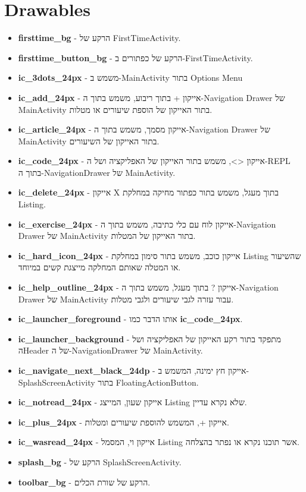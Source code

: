 \section{Drawables}

\begin{itemize}
  \item \textbf{firsttime\_bg} - הרקע של FirstTimeActivity.
  \item \textbf{firsttime\_button\_bg} - הרקע של כפתורים ב-FirstTimeActivity.
  \item \textbf{ic\_3dots\_24px} - משמש ב-MainActivity בתור Options Menu
  \item \textbf{ic\_add\_24px} - אייקון + בתוך ריבוע, משמש בתוך ה-Navigation Drawer של MainActivity בתור האייקון של הוספת שיעורים או מטלות.
  \item \textbf{ic\_article\_24px} - אייקון מסמך, משמש בתוך ה-Navigation Drawer של MainActivity בתור האייקון של השיעורים.
  \item \textbf{ic\_code\_24px} - אייקון <>, משמש בתור האייקון של האפליקציה ושל ה-REPL בתוך ה-NavigationDrawer של MainActivity.
  \item \textbf{ic\_delete\_24px} - אייקון X בתוך מעגל, משמש בתור כפתור מחיקה במחלקת Listing.
  \item \textbf{ic\_exercise\_24px}  - אייקון לוח עם כלי כתיבה, משמש בתוך ה-Navigation Drawer של MainActivity בתור האייקון של המטלות.
  \item \textbf{ic\_hard\_icon\_24px} - אייקון כוכב, משמש בתור סימון במחלקת Listing שהשיעור או המטלה שאותם המחלקה מייצגת קשים במיוחד.
  \item \textbf{ic\_help\_outline\_24px} - אייקון ? בתוך מעגל, משמש בתוך ה-Navigation Drawer של MainActivity עבור עזרה לגבי שיעורים ולגבי מטלות.
  \item \textbf{ic\_launcher\_foreground} - אותו הדבר כמו \textbf{ic\_code\_24px}.
  \item \textbf{ic\_launcher\_background} - מתפקד בתור רקע האייקון של האפליקציה ושל הHeader של ה-NavigationDrawer של MainActivity.
  \item \textbf{ic\_navigate\_next\_black\_24dp} - אייקון חץ ימינה, המשמש ב-SplashScreenActivity בתור FloatingActionButton.
  \item \textbf{ic\_notread\_24px} - אייקון שעון, המייצג Listing שלא נקרא עדיין.
  \item \textbf{ic\_plus\_24px} - אייקון +, המשמש להוספת שיעורים ומטלות.
  \item \textbf{ic\_wasread\_24px} - אייקון וי, המסמל Listing אשר תוכנו נקרא או נפתר בהצלחה.
  \item \textbf{splash\_bg} - הרקע של SplashScreenActivity.
  \item \textbf{toolbar\_bg} - הרקע של שורת הכלים.

\end{itemize}